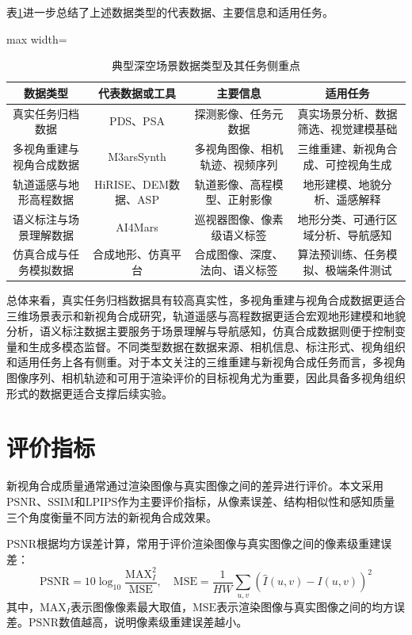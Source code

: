 表\ref{tab:2-dataset}进一步总结了上述数据类型的代表数据、主要信息和适用任务。
\begin{table}[H]
    \fontsize{10.5pt}{13.125pt}\selectfont
    \caption{典型深空场景数据类型及其任务侧重点}
    \centering\label{tab:2-dataset}
    \begin{adjustbox}{max width=\textwidth}
    \begin{tabular}{cccc}
        \toprule
        数据类型 & 代表数据或工具 & 主要信息 & 适用任务 \\
        \midrule
        真实任务归档数据 & PDS、PSA & 探测影像、任务元数据 & 真实场景分析、数据筛选、视觉建模基础 \\
        多视角重建与视角合成数据 & M3arsSynth & 多视角图像、相机轨迹、视频序列 & 三维重建、新视角合成、可控视角生成 \\
        轨道遥感与地形高程数据 & HiRISE、DEM数据、ASP & 轨道影像、高程模型、正射影像 & 地形建模、地貌分析、遥感解释 \\
        语义标注与场景理解数据 & AI4Mars & 巡视器图像、像素级语义标签 & 地形分类、可通行区域分析、导航感知 \\
        仿真合成与任务模拟数据 & 合成地形、仿真平台 & 合成图像、深度、法向、语义标签 & 算法预训练、任务模拟、极端条件测试 \\
        \bottomrule
    \end{tabular}
    \end{adjustbox}
\end{table}
总体来看，真实任务归档数据具有较高真实性，多视角重建与视角合成数据更适合三维场景表示和新视角合成研究，轨道遥感与高程数据更适合宏观地形建模和地貌分析，语义标注数据主要服务于场景理解与导航感知，仿真合成数据则便于控制变量和生成多模态监督。不同类型数据在数据来源、相机信息、标注形式、视角组织和适用任务上各有侧重。对于本文关注的三维重建与新视角合成任务而言，多视角图像序列、相机轨迹和可用于渲染评价的目标视角尤为重要，因此具备多视角组织形式的数据更适合支撑后续实验。

\section{评价指标}
新视角合成质量通常通过渲染图像与真实图像之间的差异进行评价。本文采用$\mathrm{PSNR}$、$\mathrm{SSIM}$和$\mathrm{LPIPS}$作为主要评价指标，从像素误差、结构相似性和感知质量三个角度衡量不同方法的新视角合成效果。

$\mathrm{PSNR}$根据均方误差计算，常用于评价渲染图像与真实图像之间的像素级重建误差：
\begin{equation}
    \mathrm{PSNR}=10\log_{10}\frac{\mathrm{MAX}_I^2}{\mathrm{MSE}},\quad \mathrm{MSE}=\frac{1}{HW}\sum_{u,v}\left(\hat I(u,v)-I(u,v)\right)^2
\end{equation}
其中，$\mathrm{MAX}_I$表示图像像素最大取值，$\mathrm{MSE}$表示渲染图像与真实图像之间的均方误差。$\mathrm{PSNR}$数值越高，说明像素级重建误差越小。

